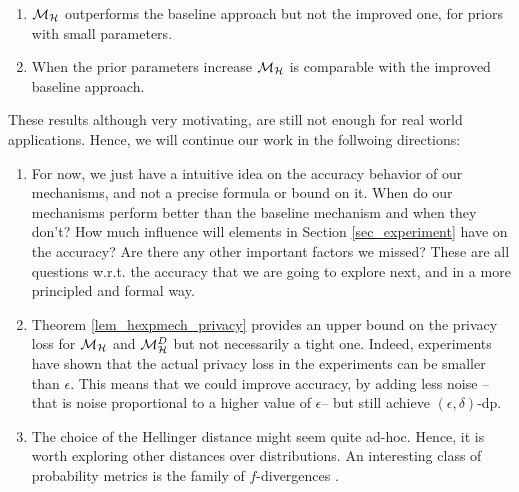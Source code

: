 \documentclass{article}
\begin{document}
\begin{enumerate}
	\item  $\mathcal{M}_{\mathcal{H}}$ outperforms the baseline approach but not the improved one, for priors with small parameters.
  	\item When the prior parameters increase $\mathcal{M}_{\mathcal{H}}$ is comparable with the improved baseline approach.
\end{enumerate}

These results although very motivating, are still not enough for real world applications. Hence, we will continue our work in the follwoing directions:
\begin{enumerate}
  \item  For now, we just have a intuitive idea on the accuracy
behavior of our mechanisms, and not a precise formula or bound on
it. When do our mechanisms perform better than the baseline mechanism
and when they don't? How much influence will elements in Section
\ref{sec_experiment} have on the accuracy? Are there any other
important factors we missed? These are all questions w.r.t. the
accuracy that we are going to explore next, and in a more principled
and formal way.
\item  Theorem \ref{lem_hexpmech_privacy} provides an upper bound on the
privacy loss for $\mathcal{M}_{\mathcal{H}}$ and $\mathcal{M}^{D}_{\mathcal{H}}$ but not necessarily a
tight one. Indeed, experiments have shown that the actual privacy loss
in the experiments can be smaller than $\epsilon$. This means that we
could improve accuracy, by adding less noise -- that is noise
proportional to a higher value of $\epsilon$-- but still achieve
$(\epsilon, \delta)$-dp.
\item The choice of the Hellinger distance might seem quite
ad-hoc. Hence, it is worth exploring other distances over
distributions. An interesting class of probability metrics is the
family of $f$-divergences \cite{CIT-004}.
\end{enumerate}




\end{document}
